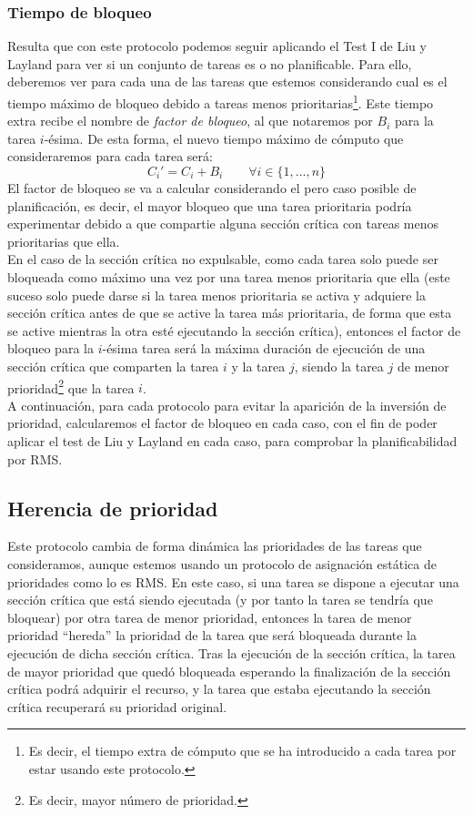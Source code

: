 \subsubsection{Tiempo de bloqueo}
Resulta que con este protocolo podemos seguir aplicando el Test I de Liu y Layland para ver si un conjunto de tareas es o no planificable. Para ello, deberemos ver para cada una de las tareas que estemos considerando cual es el tiempo máximo de bloqueo debido a tareas menos prioritarias\footnote{Es decir, el tiempo extra de cómputo que se ha introducido a cada tarea por estar usando este protocolo.}. Este tiempo extra recibe el nombre de \textit{factor de bloqueo}, al que notaremos por $B_i$ para la tarea $i$-ésima. De esta forma, el nuevo tiempo máximo de cómputo que consideraremos para cada tarea será:
\begin{equation*}
    C_i' = C_i + B_i \qquad \forall i \in \{1,\ldots,n\}
\end{equation*}
El factor de bloqueo se va a calcular considerando el pero caso posible de planificación, es decir, el mayor bloqueo que una tarea prioritaria podría experimentar debido a que compartie alguna sección crítica con tareas menos prioritarias que ella.\\

En el caso de la sección crítica no expulsable, como cada tarea solo puede ser bloqueada como máximo una vez por una tarea menos prioritaria que ella (este suceso solo puede darse si la tarea menos prioritaria se activa y adquiere la sección crítica antes de que se active la tarea más prioritaria, de forma que esta se active mientras la otra esté ejecutando la sección crítica), entonces el factor de bloqueo para la $i$-ésima tarea será la máxima duración de ejecución de una sección crítica que comparten la tarea $i$ y la tarea $j$, siendo la tarea $j$ de menor prioridad\footnote{Es decir, mayor número de prioridad.} que la tarea $i$.\\

A continuación, para cada protocolo para evitar la aparición de la inversión de prioridad, calcularemos el factor de bloqueo en cada caso, con el fin de poder aplicar el test de Liu y Layland en cada caso, para comprobar la planificabilidad por RMS\@.

\subsection{Herencia de prioridad}
Este protocolo cambia de forma dinámica las prioridades de las tareas que consideramos, aunque estemos usando un protocolo de asignación estática de prioridades como lo es RMS\@. En este caso, si una tarea se dispone a ejecutar una sección crítica que está siendo ejecutada (y por tanto la tarea se tendría que bloquear) por otra tarea de menor prioridad, entonces la tarea de menor prioridad ``hereda'' la prioridad de la tarea que será bloqueada durante la ejecución de dicha sección crítica. Tras la ejecución de la sección crítica, la tarea de mayor prioridad que quedó bloqueada esperando la finalización de la sección crítica podrá adquirir el recurso, y la tarea que estaba ejecutando la sección crítica recuperará su prioridad original.

